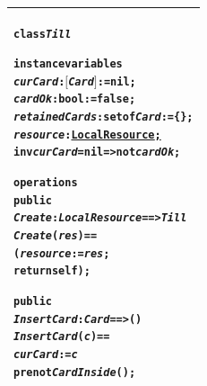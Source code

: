 \documentclass[\pformat,12pt,twoside]{article}
\newenvironment{VDMgray}%
{\begin{tabular}{|G|}\hline\small\begin{alltt}}%
{\end{alltt}\normalsize\\
 \hline\end{tabular}}
\begin{document}
\begin{VDMgray}
\textbf{class} \textit{Till}

\textbf{instance} \textbf{variables}
 \textit{curCard} : \ensuremath{[}\textit{Card}\ensuremath{]} := \textbf{nil};
 \textit{cardOk} : \textbf{bool} := \textbf{false};
 \textit{retainedCards} : \textbf{set} \textbf{of} \textit{Card} := \{\};
 \textit{resource} : {\underline{LocalResource}}{\underline{;}}
 \textbf{inv} \textit{curCard} = \textbf{nil} =\texttt{>} \textbf{not} \textit{cardOk};

\textbf{operations}
 \textbf{public}
 \textit{Create}: \textit{LocalResource} ==\texttt{>} \textit{Till}
 \textit{Create}(\textit{res}) ==
   (\textit{resource} := \textit{res};
    \textbf{return} \textbf{self});

 \textbf{public}
 \textit{InsertCard} : \textit{Card} ==\texttt{>} ()
 \textit{InsertCard}(\textit{c}) ==
   \textit{curCard} := \textit{c}
 \textbf{pre} \textbf{not} \textit{CardInside}();
\end{VDMgray}
\end{document}

